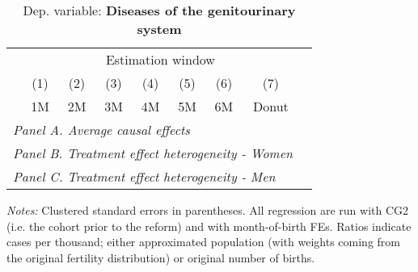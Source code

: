  \begin{table}[H] \begin{threeparttable} \centering \caption{Dep. variable: \textbf{Diseases of the genitourinary system}} {\def\sym#1{\ifmmode^{#1}\else\(^{#1}\)\fi} \begin{tabular}{l*{8}{c}} \toprule & \multicolumn{7}{c}{Estimation window} \\ \cmidrule(lr){2-8}
            &\multicolumn{1}{c}{(1)}&\multicolumn{1}{c}{(2)}&\multicolumn{1}{c}{(3)}&\multicolumn{1}{c}{(4)}&\multicolumn{1}{c}{(5)}&\multicolumn{1}{c}{(6)}&\multicolumn{1}{c}{(7)}\\
            &\multicolumn{1}{c}{1M}&\multicolumn{1}{c}{2M}&\multicolumn{1}{c}{3M}&\multicolumn{1}{c}{4M}&\multicolumn{1}{c}{5M}&\multicolumn{1}{c}{6M}&\multicolumn{1}{c}{Donut}\\
\midrule
 \multicolumn{8}{l}{\emph{Panel A. Average causal effects}} \\       \midrule\multicolumn{8}{l}{\emph{Panel B. Treatment effect heterogeneity - Women}} \\       \midrule\multicolumn{8}{l}{\emph{Panel C. Treatment effect heterogeneity - Men}} \\       
\bottomrule \end{tabular} } \begin{tablenotes} \item \scriptsize \emph{Notes:} Clustered standard errors in parentheses. All regression are run with CG2 (i.e. the cohort prior to the reform) and with month-of-birth FEs. Ratios indicate cases per thousand; either approximated population (with weights coming from the original fertility distribution) or original number of births. \end{tablenotes} \end{threeparttable} \end{table} 
